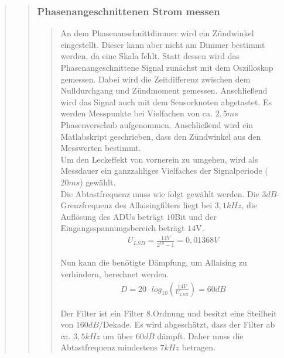 \begin{quote}
\begin{quote}
		\subsubsection{Phasenangeschnittenen Strom messen}
		\begin{quote}
		An dem Phasenanschnittdimmer wird ein Zündwinkel eingestellt. Dieser kann aber nicht am Dimmer 
		bestimmt werden, da eine Skala fehlt. Statt dessen wird das Phasenangeschnittene Signal zunächst 
		mit dem Oszilloskop gemessen. Dabei wird die Zeitdifferenz zwischen dem
		Nulldurchgang und Zündmoment gemessen. Anschließend wird das Signal auch mit dem Sensorknoten abgetastet.
		Es werden Messpunkte bei Vielfachen von ca. $2,5ms$ Phasenverschub
		aufgenommen.
		Anschließend wird ein Matlabskript geschrieben, dass den Zündwinkel aus den Messwerten bestimmt.\\ 
		Um den Leckeffekt von vornerein zu umgehen, wird als Messdauer ein
		ganzzahliges Vielfaches der Signalperiode ($20ms$) gewählt.\\ 
		Die Abtastfrequenz muss wie folgt gewählt werden. Die $3dB$-Grenzfrequenz des
		Allaisingfilters liegt bei $3,1kHz$, die Auflösung des ADUs beträgt $10$Bit
		und der Eingangsspannungsbereich beträgt $14$V.\\
		
		\begin{align}
		U_{LSB} = \frac{14V}{2^{10}-1} = 0,01368V 
		\end{align} 
		
		Nun kann die benötigte Dämpfung, um Allaising zu verhindern, berechnet werden.\\
		
		\begin{align}
		D = 20 \cdot log_{10}(\frac{14V}{U_{LSB}}) = 60dB
		\end{align} 
		
		Der Filter ist ein Filter $8$.Ordnung und besitzt eine Steilheit von
		$160dB$/Dekade. Es wird abgeschätzt, dass der Filter ab ca. $3,5kHz$ um über
		$60dB$ dämpft. Daher muss die Abtastfrequenz mindestens $7kHz$ betragen.
		
		
		

\end{quote}
\end{quote}
\end{quote}

